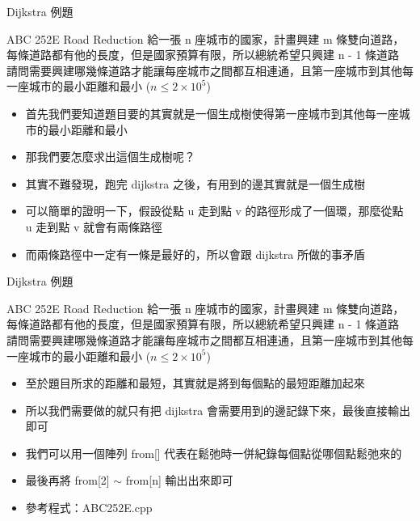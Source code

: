 \documentclass[aspectratio=169]{beamer}
\begin{document}
    \begin{frame}{Dijkstra 例題}
        \begin{block}{ABC 252E Road Reduction}
            給一張 n 座城市的國家，計畫興建 m 條雙向道路，每條道路都有他的長度，但是國家預算有限，所以總統希望只興建 n - 1 條道路\\
            請問需要興建哪幾條道路才能讓每座城市之間都互相連通，且第一座城市到其他每一座城市的最小距離和最小 ($n \le 2 \times 10^5$)
        \end{block}

        \begin{itemize}
            \item<1-> 首先我們要知道題目要的其實就是一個生成樹使得第一座城市到其他每一座城市的最小距離和最小
            \item<2-> 那我們要怎麼求出這個生成樹呢？
            \item<3-> 其實不難發現，跑完 dijkstra 之後，有用到的邊其實就是一個生成樹
            \item<4-> 可以簡單的證明一下，假設從點 u 走到點 v 的路徑形成了一個環，那麼從點 u 走到點 v 就會有兩條路徑
            \item<5-> 而兩條路徑中一定有一條是最好的，所以會跟 dijkstra 所做的事矛盾
        \end{itemize}
    \end{frame}

    \begin{frame}{Dijkstra 例題}
        \begin{block}{ABC 252E Road Reduction}
            給一張 n 座城市的國家，計畫興建 m 條雙向道路，每條道路都有他的長度，但是國家預算有限，所以總統希望只興建 n - 1 條道路\\
            請問需要興建哪幾條道路才能讓每座城市之間都互相連通，且第一座城市到其他每一座城市的最小距離和最小 ($n \le 2 \times 10^5$)
        \end{block}

        \begin{itemize}
            \item<1-> 至於題目所求的距離和最短，其實就是將到每個點的最短距離加起來
            \item<2-> 所以我們需要做的就只有把 dijkstra 會需要用到的邊記錄下來，最後直接輸出即可
            \item<3-> 我們可以用一個陣列 from[] 代表在鬆弛時一併紀錄每個點從哪個點鬆弛來的
            \item<4-> 最後再將 from[2] $\sim$ from[n] 輸出出來即可
            \item<4-> 參考程式：ABC252E.cpp
        \end{itemize}
    \end{frame}
\end{document}
